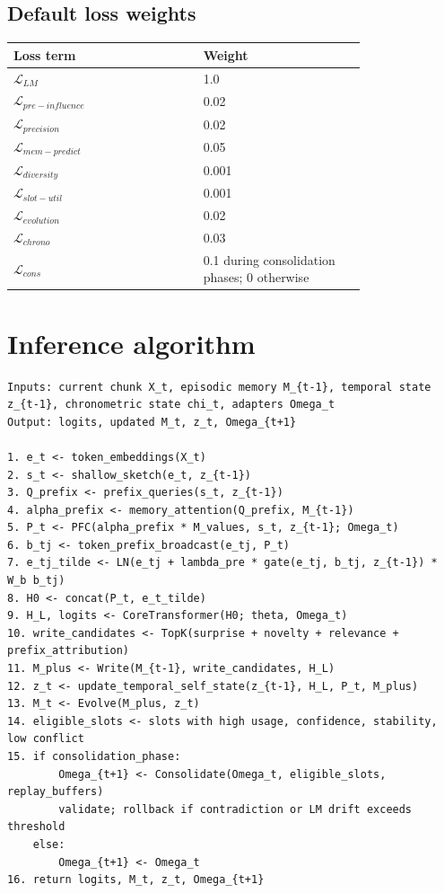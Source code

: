 \documentclass[11pt]{article}
\begin{document}
\subsection{Default loss weights}

\begin{longtable}{p{0.42\linewidth}p{0.36\linewidth}}
\toprule
\textbf{Loss term} & \textbf{Weight}\\
\midrule
\(\mathcal{L}_{LM}\) & 1.0 \\
\(\mathcal{L}_{pre-influence}\) & 0.02 \\
\(\mathcal{L}_{precision}\) & 0.02 \\
\(\mathcal{L}_{mem-predict}\) & 0.05 \\
\(\mathcal{L}_{diversity}\) & 0.001 \\
\(\mathcal{L}_{slot-util}\) & 0.001 \\
\(\mathcal{L}_{evolution}\) & 0.02 \\
\(\mathcal{L}_{chrono}\) & 0.03 \\
\(\mathcal{L}_{cons}\) & 0.1 during consolidation phases; 0 otherwise \\
\bottomrule
\end{longtable}

\section{Inference algorithm}

\begin{lstlisting}[caption={IPCN inference for one chunk.}]
Inputs: current chunk X_t, episodic memory M_{t-1}, temporal state z_{t-1}, chronometric state chi_t, adapters Omega_t
Output: logits, updated M_t, z_t, Omega_{t+1}

1. e_t <- token_embeddings(X_t)
2. s_t <- shallow_sketch(e_t, z_{t-1})
3. Q_prefix <- prefix_queries(s_t, z_{t-1})
4. alpha_prefix <- memory_attention(Q_prefix, M_{t-1})
5. P_t <- PFC(alpha_prefix * M_values, s_t, z_{t-1}; Omega_t)
6. b_tj <- token_prefix_broadcast(e_tj, P_t)
7. e_tj_tilde <- LN(e_tj + lambda_pre * gate(e_tj, b_tj, z_{t-1}) * W_b b_tj)
8. H0 <- concat(P_t, e_t_tilde)
9. H_L, logits <- CoreTransformer(H0; theta, Omega_t)
10. write_candidates <- TopK(surprise + novelty + relevance + prefix_attribution)
11. M_plus <- Write(M_{t-1}, write_candidates, H_L)
12. z_t <- update_temporal_self_state(z_{t-1}, H_L, P_t, M_plus)
13. M_t <- Evolve(M_plus, z_t)
14. eligible_slots <- slots with high usage, confidence, stability, low conflict
15. if consolidation_phase:
        Omega_{t+1} <- Consolidate(Omega_t, eligible_slots, replay_buffers)
        validate; rollback if contradiction or LM drift exceeds threshold
    else:
        Omega_{t+1} <- Omega_t
16. return logits, M_t, z_t, Omega_{t+1}
\end{lstlisting}
\end{document}

